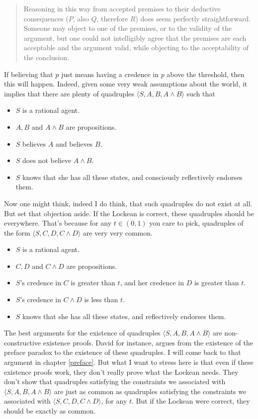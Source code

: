 \documentclass[11pt,]{book}
\providecommand{\tightlist}{%
  \setlength{\itemsep}{0pt}\setlength{\parskip}{0pt}}
\begin{document}
\begin{quote}
Reasoning in this way from accepted premises to their deductive consequences (\(P\), also \(Q\), therefore \(R\)) does seem perfectly straightforward. Someone may object to one of the premises, or to the validity of the argument, but one could not intelligibly agree that the premises are each acceptable and the argument valid, while objecting to the acceptability of the conclusion. \citep[ 92]{Stalnaker1984}
\end{quote}

If believing that \(p\) just means having a credence in \(p\) above the threshold, then this will happen. Indeed, given some very weak assumptions about the world, it implies that there are plenty of quadruples \(\langle S, A, B, A \wedge B \rangle\) such that

\begin{itemize}
\tightlist
\item
  \(S\) is a rational agent.
\item
  \(A, B\) and \(A \wedge B\) are propositions.
\item
  \(S\) believes \(A\) and believes \(B\).
\item
  \(S\) does not believe \(A \wedge B\).
\item
  \(S\) knows that she has all these states, and consciously reflectively
  endorses them.
\end{itemize}

Now one might think, indeed I do think, that such quadruples do not exist at all. But set that objection aside. If the Lockean is correct, these quadruples should be everywhere. That's because for any \(t \in (0, 1)\) you care to pick, quadruples of the form \(\langle S, C, D, C \wedge D \rangle\) are very very common.

\begin{itemize}
\tightlist
\item
  \(S\) is a rational agent.
\item
  \(C, D\) and \(C \wedge D\) are propositions.
\item
  \(S\)'s credence in \(C\) is greater than \(t\), and her credence in \(D\) is greater than \(t\).
\item
  \(S\)'s credence in \(C \wedge D\) is less than \(t\).
\item
  \(S\) knows that she has all these states, and reflectively endorses them.
\end{itemize}

The best arguments for the existence of quadruples \(\langle S, A, B, A \wedge B \rangle\) are non-constructive existence proofs. David \citet{Christensen2005} for instance, argues from the existence of the preface paradox to the existence of these quadruples. I will come back to that argument in chapter \ref{preface}. But what I want to stress here is that even if these existence proofs work, they don't really prove what the Lockean needs. They don't show that quadruples satisfying the constraints we associated with \(\langle S, A, B, A \wedge B \rangle\) are just as common as quadruples satisfying the constraints we associated with \(\langle S, C, D, C \wedge D \rangle\), for any \(t\). But if the Lockean were correct, they should be exactly as common.
\end{document}
